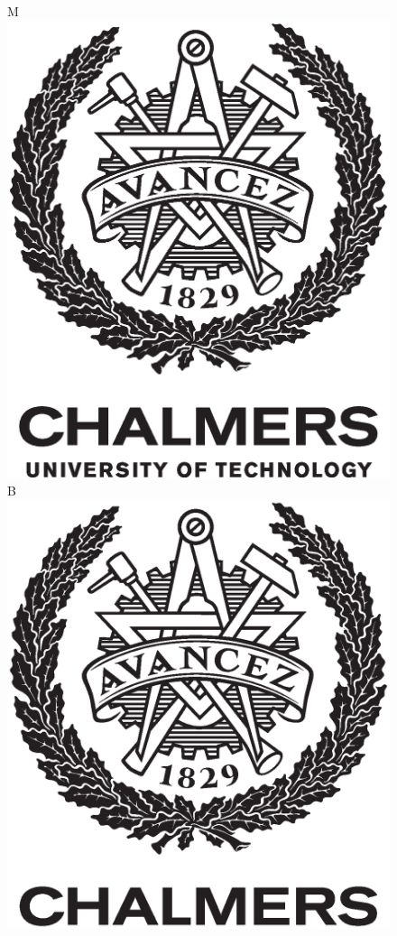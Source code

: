 \begin{center}
	\vfill	
	\begin{figure}[H]
	\centering
	\if\ThesisType M
    \includegraphics[width=0.2\pdfpagewidth]{figure/auxiliary/AvancezChalmersU_black_centered.eps} \\
    \fi
    \if\ThesisType B
    \includegraphics[width=0.2\pdfpagewidth]{figure/auxiliary/AvancezChalmers_black_centered.eps} \\

\end{figure}
\end{center}
